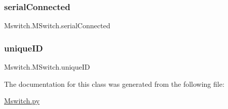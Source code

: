 \subsubsection{\texorpdfstring{serialConnected}{serialConnected}}
{\footnotesize\ttfamily Mswitch.\+M\+Switch.\+serial\+Connected}

\mbox{\label{class_mswitch_1_1_m_switch_ada61613dc2da7e94b2f0464a7479603e}} 
\subsubsection{\texorpdfstring{uniqueID}{uniqueID}}
{\footnotesize\ttfamily Mswitch.\+M\+Switch.\+unique\+ID}



The documentation for this class was generated from the following file\+:\begin{DoxyCompactItemize}
\item 
\mbox{\hyperlink{_mswitch_8py}{Mswitch.\+py}}\end{DoxyCompactItemize}
